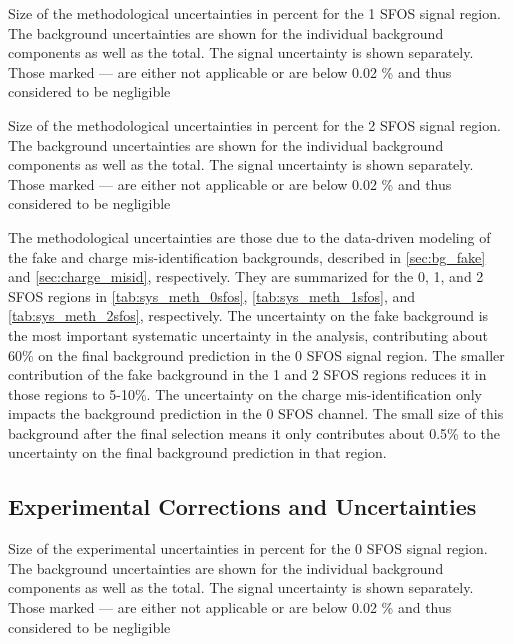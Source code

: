 \begin{table}[ht!]
\centering

\caption{Size of the methodological uncertainties in percent for the 1 SFOS signal region. The background uncertainties are shown for the individual background components as well as the total. The signal uncertainty is shown separately. Those marked --- are either not applicable or are below 0.02 \% and thus considered to be negligible}
\label{tab:sys_meth_1sfos}
\end{table}

\begin{table}[ht!]
\centering

\caption{Size of the methodological uncertainties in percent for the 2 SFOS signal region. The background uncertainties are shown for the individual background components as well as the total. The signal uncertainty is shown separately. Those marked --- are either not applicable or are below 0.02 \% and thus considered to be negligible}
\label{tab:sys_meth_2sfos}
\end{table}

The methodological uncertainties are those due to the data-driven
modeling of the fake and charge mis-identification backgrounds,
described in \sec\ref{sec:bg_fake} and \sec\ref{sec:charge_misid},
respectively.
They are summarized for the 0, 1, and 2 SFOS regions
in \tab\ref{tab:sys_meth_0sfos}, 
\tab\ref{tab:sys_meth_1sfos}, and
\tab\ref{tab:sys_meth_2sfos}, respectively.
The uncertainty on the fake background is the most important
systematic uncertainty in the analysis, contributing about 60\%
on the final background prediction in the 0 SFOS signal region.
The smaller contribution of the fake background in the 1 and 2 SFOS
regions reduces it in those regions to 5-10\%.
The uncertainty on the charge mis-identification only impacts the 
background prediction in the 0 SFOS channel.  The small size
of this background after the final selection means it only contributes
about 0.5\% to the uncertainty on the final background prediction in that
region.

\subsection{Experimental Corrections and Uncertainties}
\begin{table}[ht!]
\centering

\caption{Size of the experimental uncertainties in percent for the 0 SFOS signal region. The background uncertainties are shown for the individual background components as well as the total. The signal uncertainty is shown separately. Those marked --- are either not applicable or are below 0.02 \% and thus considered to be negligible}
\label{tab:sys_exp_0sfos}
\end{table}

